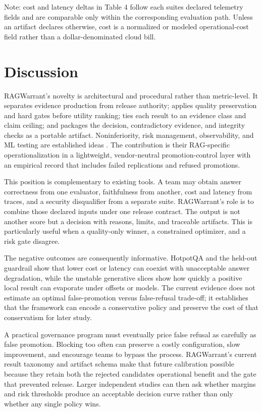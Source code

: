 \documentclass[11pt]{article}
\begin{document}
Note: cost and latency deltas in Table 4 follow each
suite\textquotesingle s declared telemetry fields and are comparable
only within the corresponding evaluation path. Unless an artifact
declares otherwise, cost is a normalized or modeled operational-cost
field rather than a dollar-denominated cloud bill.

\section{Discussion}\label{sec:discussion}

RAGWarrant's novelty is architectural and procedural
rather than metric-level. It separates evidence production from release
authority; applies quality preservation and hard gates before utility
ranking; ties each result to an evidence class and claim ceiling; and
packages the decision, contradictory evidence, and integrity checks as a
portable artifact. Noninferiority, risk management, observability, and
ML testing are established ideas \cite{tabassi2023nist,autio2024genai,iso42001,sculley2015debt,breck2017mltest,wellek2010equivalence,piaggio2012noninferiority}. The contribution is their
RAG-specific operationalization in a lightweight, vendor-neutral
promotion-control layer with an empirical record that includes failed
replications and refused promotions.

This position is complementary to existing tools. A team may obtain
answer correctness from one evaluator, faithfulness from another, cost
and latency from traces, and a security disqualifier from a separate
suite. RAGWarrant's role is to combine those declared
inputs under one release contract. The output is not another score but a
decision with reasons, limits, and traceable artifacts. This is
particularly useful when a quality-only winner, a constrained optimizer,
and a risk gate disagree.

The negative outcomes are consequently informative. HotpotQA and the
held-out guardrail show that lower cost or latency can coexist with
unacceptable answer degradation, while the unstable generative slices
show how quickly a positive local result can evaporate under offsets or
models. The current evidence does not estimate an optimal
false-promotion versus false-refusal trade-off; it establishes that the
framework can encode a conservative policy and preserve the cost of that
conservatism for later study.

A practical governance program must eventually price false refusal as
carefully as false promotion. Blocking too often can preserve a costly
configuration, slow improvement, and encourage teams to bypass the
process. RAGWarrant's current result taxonomy and
artifact schema make that future calibration possible because they
retain both the rejected candidate\textquotesingle s operational benefit
and the gate that prevented release. Larger independent studies can then
ask whether margins and risk thresholds produce an acceptable decision
curve rather than only whether any single policy wins.
\end{document}
